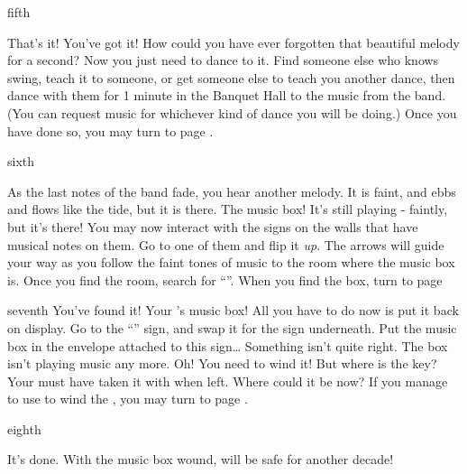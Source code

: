 \documentclass[greennotebook]{NeptuneBall}
\begin{document}
\begin{page}{fifth}

That's it! You've got it! How could you have ever forgotten that beautiful melody for a second? Now you just need to dance to it. Find someone else who knows swing, teach it to someone, or get someone else to teach you another dance, then dance with them for 1 minute in the Banquet Hall to the music from the band. (You can request music for whichever kind of dance you will be doing.) Once you have done so, you may turn to page .

\end{page}

\begin{page}{sixth}

As the last notes of the band fade, you hear another melody. It is faint, and ebbs and flows like the tide, but it is there. The music box! It's still playing - faintly, but it's there! You may now interact with the signs on the walls that have musical notes on them. Go to one of them and flip it \emph{up}. The arrows will guide your way as you follow the faint tones of music to the room where the music box is. Once you find the room, search for ``\sPacketA{}''. When you find the box, turn to page %

\end{page}

\begin{page}{seventh}
You've found it! Your \cAthena{\parent}'s music box! All you have to do now is put it back on display. Go to the ``\sArtifactZero{}'' sign, and swap it for the sign underneath. Put the music box in the envelope attached to this sign\ldots{} Something isn't quite right. The box isn't playing music any more. Oh! You need to wind it! But where is the key? Your \cAthena{\parent} must have taken it with \cAthena{\them} when \cAthena{\they} left. Where could it be now? If you manage to use \iMusicBoxKey{} to wind the \iMusicBox{}, you may turn to page .

\end{page}

\begin{page}{eighth}

It's done. With the music box wound, \pAtlantis{} will be safe for another decade!

\end{page}
\end{document}
